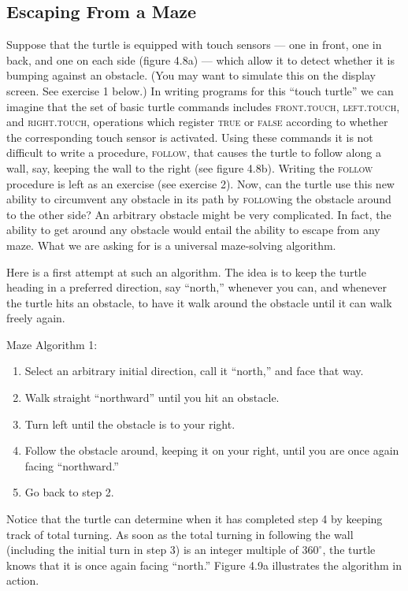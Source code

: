 \documentclass{book}
\begin{document}
\subsection{Escaping From a Maze}

Suppose that the turtle is equipped with touch sensors --- one in front,
one in back, and one on each side (figure 4.8a) --- which allow it to detect
whether it is bumping against an obstacle. (You may want to simulate
this on the display screen. See exercise 1 below.) In writing programs for
this ``touch turtle'' we can imagine that the set of basic turtle commands
includes \textsc{front}\textsc{.touch}, \textsc{left}.\textsc{touch}, and \textsc{right}.\textsc{touch}, operations which
register \textsc{true} or \textsc{false} according to whether the corresponding touch
sensor is activated. Using these commands it is not difficult to write a
procedure, \textsc{follow}, that causes the turtle to follow along a wall, say,
keeping the wall to the right (see figure 4.8b). Writing the \textsc{follow}
procedure is left as an exercise (see exercise 2).
Now, can the turtle use this new ability to circumvent any obstacle
in its path by \textsc{follow}ing the obstacle around to the other side? An
arbitrary obstacle might be very complicated. In fact, the ability to get
around any obstacle would entail the ability to escape from any maze.
What we are asking for is a universal maze-solving algorithm.

Here is a first attempt at such an algorithm. The idea is to keep the
turtle heading in a preferred direction, say ``north,'' whenever you can,
and whenever the turtle hits an obstacle, to have it walk around the
obstacle until it can walk freely again.

Maze Algorithm 1:
\begin{enumerate}
\item Select an arbitrary initial direction, call it ``north,'' and face that
way.
\item Walk straight ``northward'' until you hit an obstacle.
\item Turn left until the obstacle is to your right.
\item Follow the obstacle around, keeping it on your right, until you are
once again facing ``northward.''
\item Go back to step 2.
\end{enumerate}

Notice that the turtle can determine when it has completed step 4 by
keeping track of total turning. As soon as the total turning in following
the wall (including the initial turn in step 3) is an integer multiple of
$360^{\circ}$, the turtle knows that it is once again facing ``north.'' Figure 4.9a
illustrates the algorithm in action.
\end{document}
